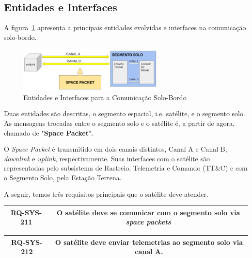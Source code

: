 \subsection{Entidades e Interfaces}

A figura~\ref{fig:interfaces} apresenta a principais entidades evolvidas e interfaces na comunicação solo-bordo.

\begin{figure}[H]
    \centering
    \includegraphics[width=0.65\textwidth]{figures/cubed_interfaces.png}
    \caption{Entidades e Interfaces para a Comunicação Solo-Bordo}
    \label{fig:interfaces}
\end{figure}

Duas entidades são descritas, o segmento espacial, i.e. satélite, e o segmento solo.
As mensagens trocadas entre o segmento solo e o satélite é, a partir de agora, chamado de "\textbf{Space Packet}".

O \textit{Space Packet} é transmitido em dois canais distintos, Canal A e Canal B, \textit{downlink} e \textit{uplink}, respectivamente.
Suas interfaces com o satélite são representadas pelo subsistema de Rastreio, Telemetria e Comando (TT\&C) e com o Segmento Solo, pela Estação Terrena.

A seguir, temos três requisitos principais que o satélite deve atender.

\begin{table}[H]
    \centering
    \begin{tabular}{|c|c|}
        \hline
        \rowcolor{orange}
        \textbf{RQ-SYS-211} & \textbf{O satélite deve se comunicar com o segmento solo via \textit{space packets}} \\ \hline
    \end{tabular}
    \label{tab:rq-sys-101}
\end{table}

\begin{table}[H]
    \centering
    \begin{tabular}{|c|c|}
        \hline
        \rowcolor{orange}
        \textbf{RQ-SYS-212} & \textbf{O satélite deve enviar telemetrias ao segmento solo via canal A.} \\ \hline
    \end{tabular}
    \label{tab:rq-sys-102}
\end{table}


